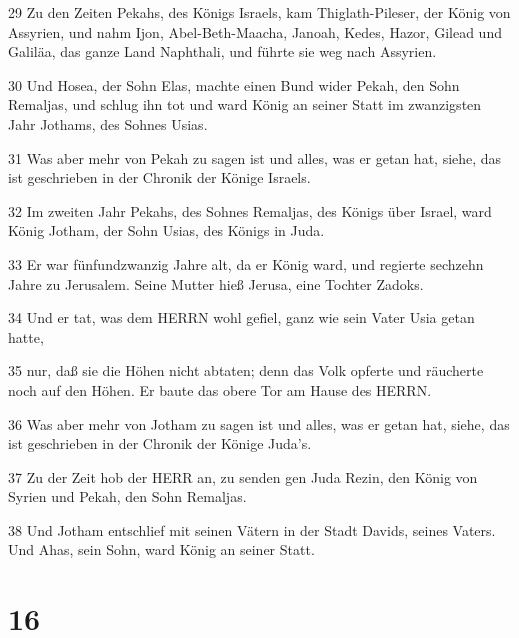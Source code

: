 \par 29 Zu den Zeiten Pekahs, des Königs Israels, kam Thiglath-Pileser, der König von Assyrien, und nahm Ijon, Abel-Beth-Maacha, Janoah, Kedes, Hazor, Gilead und Galiläa, das ganze Land Naphthali, und führte sie weg nach Assyrien.
\par 30 Und Hosea, der Sohn Elas, machte einen Bund wider Pekah, den Sohn Remaljas, und schlug ihn tot und ward König an seiner Statt im zwanzigsten Jahr Jothams, des Sohnes Usias.
\par 31 Was aber mehr von Pekah zu sagen ist und alles, was er getan hat, siehe, das ist geschrieben in der Chronik der Könige Israels.
\par 32 Im zweiten Jahr Pekahs, des Sohnes Remaljas, des Königs über Israel, ward König Jotham, der Sohn Usias, des Königs in Juda.
\par 33 Er war fünfundzwanzig Jahre alt, da er König ward, und regierte sechzehn Jahre zu Jerusalem. Seine Mutter hieß Jerusa, eine Tochter Zadoks.
\par 34 Und er tat, was dem HERRN wohl gefiel, ganz wie sein Vater Usia getan hatte,
\par 35 nur, daß sie die Höhen nicht abtaten; denn das Volk opferte und räucherte noch auf den Höhen. Er baute das obere Tor am Hause des HERRN.
\par 36 Was aber mehr von Jotham zu sagen ist und alles, was er getan hat, siehe, das ist geschrieben in der Chronik der Könige Juda's.
\par 37 Zu der Zeit hob der HERR an, zu senden gen Juda Rezin, den König von Syrien und Pekah, den Sohn Remaljas.
\par 38 Und Jotham entschlief mit seinen Vätern in der Stadt Davids, seines Vaters. Und Ahas, sein Sohn, ward König an seiner Statt.

\chapter{16}

